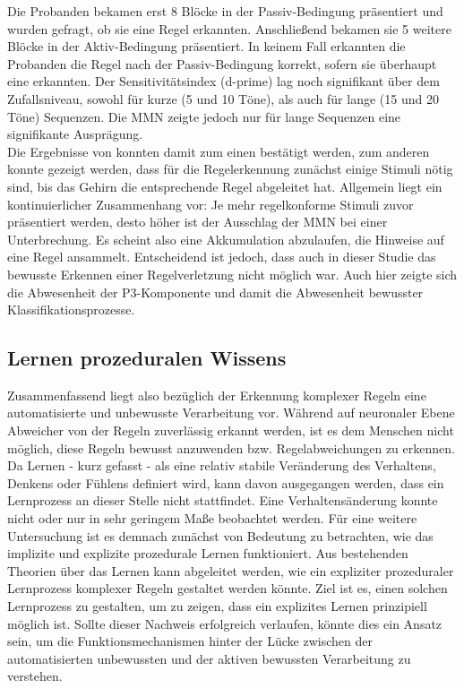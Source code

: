 \documentclass[doc,a4paper,12pt]{apa6}
\begin{document}
Die Probanden bekamen erst 8 Blöcke in der Passiv-Bedingung präsentiert und wurden gefragt, ob sie eine Regel erkannten. Anschließend bekamen sie 5 weitere Blöcke in der Aktiv-Bedingung präsentiert. In keinem Fall erkannten die Probanden die Regel nach der Passiv-Bedingung korrekt, sofern sie überhaupt eine erkannten. Der Sensitivitätsindex (d-prime) lag noch signifikant über dem Zufallsniveau, sowohl für kurze (5 und 10 Töne), als auch für lange (15 und 20 Töne) Sequenzen. Die MMN zeigte jedoch nur für lange Sequenzen eine signifikante Ausprägung.\\
Die Ergebnisse von \textcite{paavilainen2007preattentive} konnten damit zum einen bestätigt werden, zum anderen konnte gezeigt werden, dass für die Regelerkennung zunächst einige Stimuli nötig sind, bis das Gehirn die entsprechende Regel abgeleitet hat. Allgemein liegt ein kontinuierlicher Zusammenhang vor: Je mehr regelkonforme Stimuli zuvor präsentiert werden, desto höher ist der Ausschlag der MMN bei einer Unterbrechung. Es scheint also eine Akkumulation abzulaufen, die Hinweise auf eine Regel ansammelt. Entscheidend ist jedoch, dass auch in dieser Studie das bewusste Erkennen einer Regelverletzung nicht möglich war. Auch hier zeigte sich die Abwesenheit der P3-Komponente und damit die Abwesenheit bewusster Klassifikationsprozesse.

\subsection{Lernen prozeduralen Wissens}

Zusammenfassend liegt also bezüglich der Erkennung komplexer Regeln eine automatisierte und unbewusste Verarbeitung vor. Während auf neuronaler Ebene Abweicher von der Regeln zuverlässig erkannt werden, ist es dem Menschen nicht möglich, diese Regeln bewusst anzuwenden bzw. Regelabweichungen zu erkennen. Da Lernen - kurz gefasst - als eine relativ stabile Veränderung des Verhaltens, Denkens oder Fühlens definiert wird, kann davon ausgegangen werden, dass ein Lernprozess an dieser Stelle nicht stattfindet. Eine Verhaltensänderung konnte nicht oder nur in sehr geringem Maße beobachtet werden. Für eine weitere Untersuchung ist es demnach zunächst von Bedeutung zu betrachten, wie das implizite und explizite prozedurale Lernen funktioniert. Aus bestehenden Theorien über das Lernen kann abgeleitet werden, wie ein expliziter prozeduraler Lernprozess komplexer Regeln gestaltet werden könnte. Ziel ist es, einen solchen Lernprozess zu gestalten, um zu zeigen, dass ein explizites Lernen prinzipiell möglich ist. Sollte dieser Nachweis erfolgreich verlaufen, könnte dies ein Ansatz sein, um die Funktionsmechanismen hinter der Lücke zwischen der automatisierten unbewussten und der aktiven bewussten Verarbeitung zu verstehen.
\end{document}
